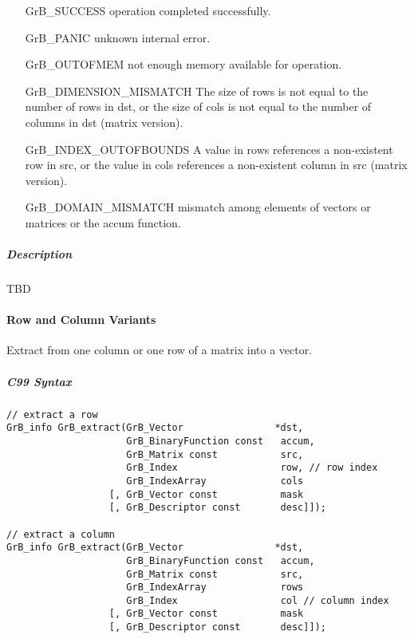 \begin{itemize}[leftmargin=2.1in]
\item[{\sf GrB\_SUCCESS}] 	operation completed successfully.
\item[{\sf GrB\_PANIC}]	    unknown internal error.
\item[{\sf GrB\_OUTOFMEM}]	not enough memory available for operation.
\item[{\sf GrB\_DIMENSION\_MISMATCH}] 
        The size of rows is not equal to the number of rows in dst, or
        the size of cols is not equal to the number of columns in dst (matrix version).
\item[{\sf GrB\_INDEX\_OUTOFBOUNDS}]
        A value in rows references a non-existent row in src, or
	    the value in cols references a non-existent column in src (matrix version).
\item[\sf GrB\_DOMAIN\_MISMATCH]  
	   mismatch among elements of vectors or matrices or the accum function. 
\end{itemize}


\subparagraph{Description}

TBD

\paragraph{Row and Column Variants}

Extract from one column or one row of a matrix into a vector. 



\subparagraph{C99 Syntax}

\begin{verbatim}
// extract a row
GrB_info GrB_extract(GrB_Vector                *dst, 
                     GrB_BinaryFunction const   accum,
                     GrB_Matrix const           src,
                     GrB_Index                  row, // row index
                     GrB_IndexArray             cols
                  [, GrB_Vector const           mask
                  [, GrB_Descriptor const       desc]]);

// extract a column
GrB_info GrB_extract(GrB_Vector                *dst, 
                     GrB_BinaryFunction const   accum,
                     GrB_Matrix const           src, 
                     GrB_IndexArray             rows
                     GrB_Index                  col // column index
                  [, GrB_Vector const           mask
                  [, GrB_Descriptor const       desc]]);
\end{verbatim}

